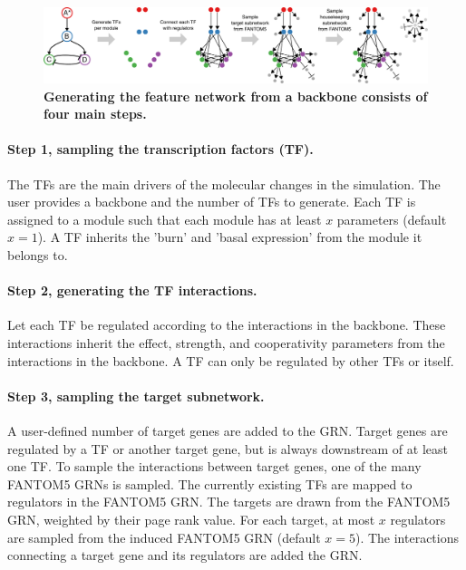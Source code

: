 \begin{figure}[htb!]
	\centering
	\includegraphics[width=\linewidth]{fig/gen_feature_network} 
	\caption{
		\textbf{Generating the feature network from a backbone consists of four main steps.}
	}
	\label{fig:gen_feature_network}
\end{figure}

\paragraph{Step 1, sampling the transcription factors (TF).} The TFs are the main drivers of the molecular changes in the simulation. The user provides a backbone and the number of TFs to generate. Each TF is assigned to a module such that each module has at least $x$ parameters (default $x=1$). A TF inherits the 'burn' and 'basal expression' from the module it belongs to.

\paragraph{Step 2, generating the TF interactions.} Let each TF be regulated according to the interactions in the backbone. These interactions inherit the effect, strength, and cooperativity parameters from the interactions in the backbone. A TF can only be regulated by other TFs or itself.

\paragraph{Step 3, sampling the target subnetwork.} 
A user-defined number of target genes are added to the GRN. Target genes are regulated by a TF or another target gene, but is always downstream of at least one TF. To sample the interactions between target genes, one of the many FANTOM5 \cite{lizio_gatewaysfantom5promoter_2015} GRNs is sampled. The currently existing TFs are mapped to regulators in the FANTOM5 GRN. The targets are drawn from the FANTOM5 GRN, weighted by their page rank value. For each target, at most $x$ regulators are sampled from the induced FANTOM5 GRN (default $x=5$). The interactions connecting a target gene and its regulators are added the GRN.


